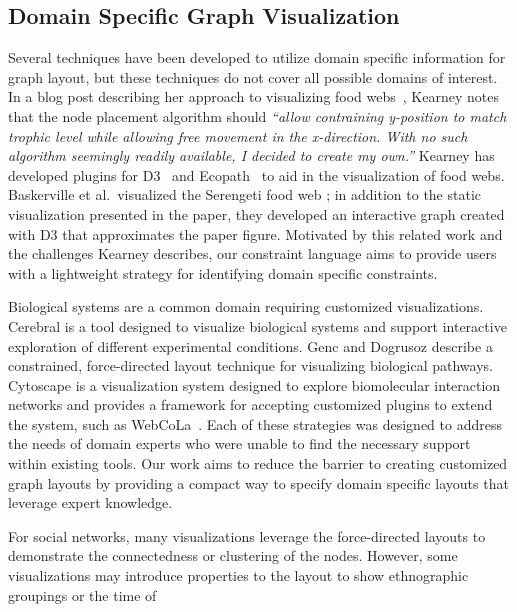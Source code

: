 \subsection{Domain Specific Graph Visualization}
Several techniques have been developed to utilize
domain specific information for graph layout, but these techniques do not cover
all possible domains of interest. In a blog post describing her approach to
visualizing food webs~\cite{kearney2016blog}, Kearney notes that the node
placement algorithm should \emph{``allow contraining y-position to match
  trophic level while allowing free movement in the x-direction. With no
  such algorithm seemingly readily available, I decided to create my
  own.''} Kearney has developed plugins for D3~\cite{kearney2017d3} and
Ecopath~\cite{kearney2017ecopath} to aid in the visualization of
food webs. Baskerville et al.\ visualized the Serengeti food web
\cite{baskerville2011spatial}; in addition to the static visualization
presented in the paper, they developed an interactive graph
\cite{baskerville2011interactive} created with D3 that approximates the
paper figure. Motivated by this related work and the
challenges Kearney describes, our constraint language aims to provide users
with a lightweight strategy for identifying domain specific constraints.

Biological systems are a common domain requiring customized visualizations.
Cerebral \cite{barsky2008cerebral} is a tool designed to visualize
biological systems and support interactive exploration of different
experimental conditions. Genc and Dogrusoz \cite{saraiya2005visualizing}
describe a constrained, force-directed layout technique for visualizing 
biological pathways. Cytoscape \cite{shannon2003cytoscape} is a
visualization system designed to explore biomolecular interaction networks
and provides a framework for accepting customized plugins to extend the
system, such as WebCoLa~\cite{WebCoLa}. Each of these strategies was designed to
address the needs of domain experts who were unable to find the necessary
support within existing tools. Our work aims to reduce the barrier to
creating customized graph layouts by providing a compact way to specify domain
specific layouts that leverage expert knowledge.

For social networks, many visualizations leverage the force-directed layouts
to demonstrate the connectedness or clustering of the nodes. However, some
visualizations may introduce properties to the layout to show ethnographic
groupings \cite{rothenberg1998using} or the time of 




